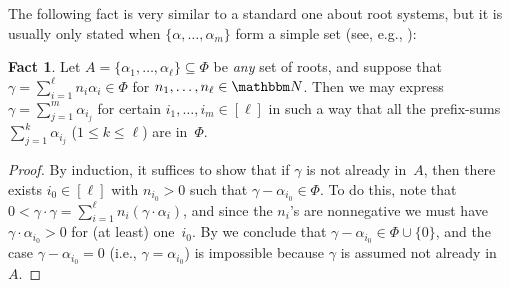 \documentclass[10pt,a4paper]{article}
\newtheorem{lemma}[theorem]{Lemma}
\theoremstyle{definition}
\newtheorem{fact}[theorem]{Fact}
\newcommand{\N}{\mathbbm N}
\begin{document}
The following fact is very similar to a standard one about root systems, but it is usually only stated when $\{\alpha, \dots, \alpha_m\}$ form a simple set (see, e.g., \cite[Lem.~3.6.2]{Car89}):
\begin{fact}    \label{fact:prefixsum}
    Let $A = \{\alpha_1, \dots, \alpha_\ell\} \subseteq \Phi$ be \emph{any} set of roots, and suppose that $\gamma = \sum_{i=1}^\ell n_i \alpha_i \in \Phi$ for $n_1, \dots, n_\ell \in \N$.
    Then we may express $\gamma = \sum_{j=1}^m \alpha_{i_j}$ for certain $i_1, \dots, i_m \in [\ell]$ in such a way that all the prefix-sums $\sum_{j=1}^k \alpha_{i_j}$ ($1 \leq k \leq \ell$) are in~$\Phi$.
\end{fact}
\begin{proof}
    By induction, it suffices to show that if $\gamma$ is not already in~$A$, then there exists $i_0 \in [\ell]$ with $n_{i_0} > 0$ such that $\gamma - \alpha_{i_0} \in \Phi$.
    To do this, note that $0 < \gamma \cdot \gamma = \sum_{i=1}^\ell  n_i (\gamma \cdot \alpha_i)$, and since the $n_i$'s are nonnegative we must have $\gamma \cdot \alpha_{i_0} > 0$ for (at least) one~$i_0$.
    By  we conclude that $\gamma - \alpha_{i_0} \in \Phi \cup \{0\}$, and the case $\gamma - \alpha_{i_0} = 0$ (i.e., $\gamma = \alpha_{i_0}$) is impossible because $\gamma$ is assumed not already in~$A$.
\end{proof}
\end{document}

